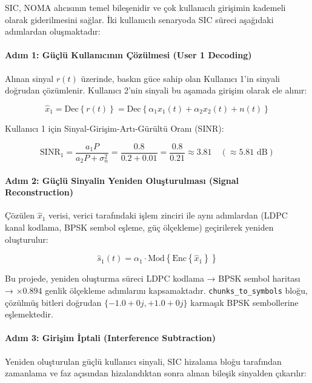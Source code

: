 \documentclass[
]{IEEEtran}
\begin{document}
SIC, NOMA alıcısının temel bileşenidir ve çok kullanıcılı girişimin
kademeli olarak giderilmesini sağlar. İki kullanıcılı senaryoda SIC
süreci aşağıdaki adımlardan oluşmaktadır:

\paragraph{Adım 1: Güçlü Kullanıcının Çözülmesi (User 1
Decoding)}\label{adux131m-1-guxfcuxe7luxfc-kullanux131cux131nux131n-uxe7uxf6zuxfclmesi-user-1-decoding}

Alınan sinyal \(r(t)\) üzerinde, baskın güce sahip olan Kullanıcı 1'in
sinyali doğrudan çözümlenir. Kullanıcı 2'nin sinyali bu aşamada girişim
olarak ele alınır:

\[\hat{x}_1 = \text{Dec}\left\{ r(t) \right\} = \text{Dec}\left\{ \alpha_1 x_1(t) + \alpha_2 x_2(t) + n(t) \right\}\]

Kullanıcı 1 için Sinyal-Girişim-Artı-Gürültü Oranı (SINR):

\[\text{SINR}_1 = \frac{a_1 P}{a_2 P + \sigma_n^2} = \frac{0.8}{0.2 + 0.01} = \frac{0.8}{0.21} \approx 3.81 \quad (\approx 5.81 \text{ dB})\]

\paragraph{Adım 2: Güçlü Sinyalin Yeniden Oluşturulması (Signal
Reconstruction)}\label{adux131m-2-guxfcuxe7luxfc-sinyalin-yeniden-oluux15fturulmasux131-signal-reconstruction}

Çözülen \(\hat{x}_1\) verisi, verici tarafındaki işlem zinciri ile aynı
adımlardan (LDPC kanal kodlama, BPSK sembol eşleme, güç ölçekleme)
geçirilerek yeniden oluşturulur:

\[\hat{s}_1(t) = \alpha_1 \cdot \text{Mod}\left\{ \text{Enc}\left\{ \hat{x}_1 \right\} \right\}\]

Bu projede, yeniden oluşturma süreci LDPC kodlama → BPSK sembol haritası
→ \(\times 0.894\) genlik ölçekleme adımlarını kapsamaktadır.
\texttt{chunks\_to\_symbols} bloğu, çözülmüş bitleri doğrudan
\(\{-1.0 + 0j, +1.0 + 0j\}\) karmaşık BPSK sembollerine eşlemektedir.

\paragraph{Adım 3: Girişim İptali (Interference
Subtraction)}\label{adux131m-3-giriux15fim-iptali-interference-subtraction}

Yeniden oluşturulan güçlü kullanıcı sinyali, SIC hizalama bloğu
tarafından zamanlama ve faz açısından hizalandıktan sonra alınan bileşik
sinyalden çıkarılır:
\end{document}
